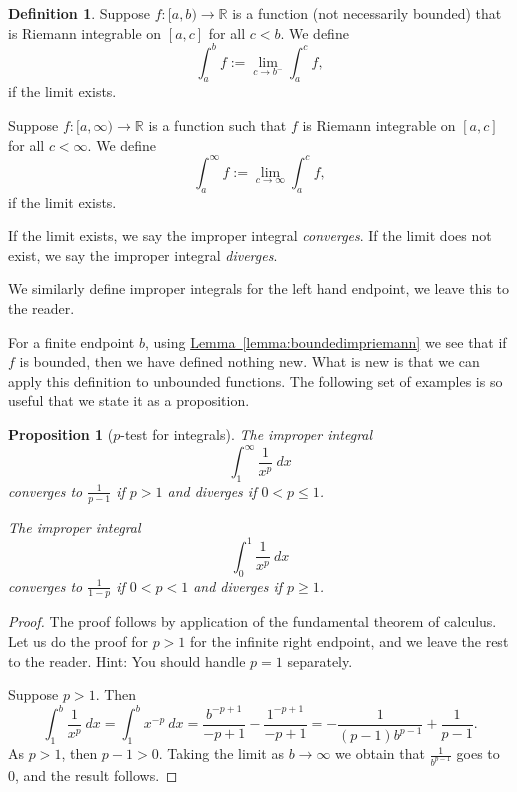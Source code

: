 \documentclass[12pt]{book}
\newcommand{\R}{{\mathbb{R}}}
\newcommand{\myindex}[1]{#1\index{#1}}
\theoremstyle{plain}
\newtheorem{prop}[thm]{Proposition}
\theoremstyle{remark}
\theoremstyle{definition}
\newtheorem{defn}[thm]{Definition}
\theoremstyle{exercise}
\theoremstyle{example}
\newcommand{\lemmaref}[1]{\hyperref[#1]{Lemma~\ref*{#1}}}
\begin{document}
\begin{defn}
Suppose $f \colon [a,b) \to \R$ is a function (not necessarily bounded)
that is Riemann integrable on $[a,c]$ for all $c < b$.  We define
\begin{equation*}
\int_a^b f := \lim_{c \to b^-} \int_a^{c} f ,
\end{equation*}
if the limit exists.

Suppose $f \colon [a,\infty) \to \R$ is a function such that
$f$ is Riemann integrable on $[a,c]$ for all $c < \infty$.  
We define
\begin{equation*}
\int_a^\infty f := \lim_{c \to \infty} \int_a^c f ,
\end{equation*}
if the limit exists.

If the limit exists, we say the improper integral
\emph{\myindex{converges}}.
If the limit does not exist, we say the improper integral
\emph{\myindex{diverges}}.

We similarly define improper integrals for the left hand endpoint, we leave
this to the reader.
\end{defn}

For a finite endpoint $b$,
using \lemmaref{lemma:boundedimpriemann} we see that if
$f$ is bounded, then we have defined nothing new.  What is new is that
we can apply this definition to unbounded functions.
The following set of examples is
so useful that we state it as a proposition.

\begin{prop}[$p$-test for integrals]
\label{impropriemann:ptest}
The improper integral
\begin{equation*}
\int_1^\infty \frac{1}{x^p} ~dx
\end{equation*}
converges to $\frac{1}{p-1}$ if $p > 1$ and diverges if $0 < p \leq 1$.

The improper integral
\begin{equation*}
\int_0^1 \frac{1}{x^p} ~dx
\end{equation*}
converges to $\frac{1}{1-p}$ if $0 < p < 1$ and diverges if $p \geq 1$.
\end{prop}

\begin{proof}
The proof follows by application of the fundamental theorem of calculus.
Let us do the proof for $p > 1$ for the infinite right endpoint, and
we leave the rest to the reader.  Hint: You should handle $p=1$
separately.

Suppose $p > 1$.  Then
\begin{equation*}
\int_1^b \frac{1}{x^p} ~dx
=
\int_1^b x^{-p} ~dx
=
\frac{b^{-p+1}}{-p+1}
-
\frac{1^{-p+1}}{-p+1}
=
-
\frac{1}{(p-1)b^{p-1}}
+
\frac{1}{p-1} .
\end{equation*}
As $p > 1$, then $p-1 > 0$.  Taking the limit as $b \to \infty$
we obtain that $\frac{1}{b^{p-1}}$ goes to 0, and the result follows.
\end{proof}
\end{document}
